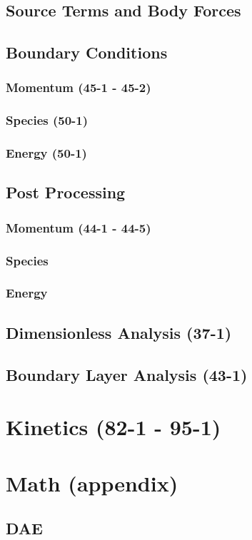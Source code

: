 \documentclass{mitqualif}
\begin{document}
\section{Source Terms and Body Forces}
\section{Boundary Conditions}
\subsection{Momentum (45-1 - 45-2)}
\subsection{Species (50-1)}
\subsection{Energy (50-1)}
\section{Post Processing}
\subsection{Momentum (44-1 - 44-5)}
\subsection{Species}
\subsection{Energy}
\section{Dimensionless Analysis (37-1)}

\section{Boundary Layer Analysis (43-1)}
\newpage
\chapter{Kinetics (82-1 - 95-1)}
\newpage
\chapter{Math (appendix)}
\section{DAE}
\end{document}
